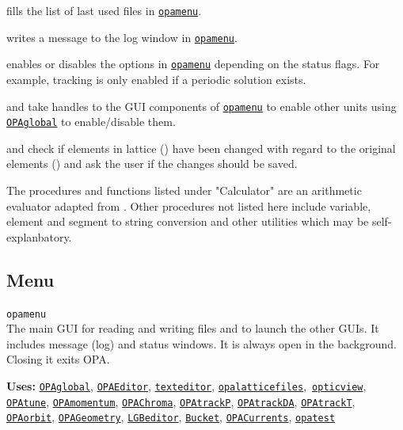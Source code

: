 \documentclass[12pt]{article}
\newcommand\code[1]{{\tt #1}}
\newcommand{\unico}[1]{{\color{burntorange}\code{#1}}}
\newcommand{\opagui}[1]{\colorbox{blue!20}{\code{#1}}}
\newcommand{\oguih}[2]{\subsection{\label{#2}#1}{\Huge\opagui{#2}}\\}
\newcommand{\ogui}[1]{\hyperref[#1]{\opagui{#1}}}
\newcommand{\opauni}[1]{\colorbox{orange!30}{\code{#1}}}
\newcommand{\ouni}[1]{\hyperref[#1]{\opauni{#1}}}
\newcommand{\uses}[1]{{\bf Uses: } #1}
\newcommand{\desc}[1]{#1}
\begin{document}
{\unico{FillComboSeg} fills the list of last used files in \ogui{opamenu}.

\unico{OPALog} writes a message to the log window in \ogui{opamenu}.

\unico{MainButtonEnable} enables or disables the options in \ogui{opamenu} depending on the status flags. For example, tracking is only enabled if a periodic solution exists.

\unico{PassMainButtonHandles} and \unico{passErrLogHandle} take handles to the GUI components of \ogui{opamenu} to enable other units using \ouni{OPAglobal} to enable/disable them.

\unico{EllaSave} and \unico{Elcompare} check if elements in lattice (\unico{Ella}) have been changed with regard to the original elements (\unico{Elem}) and ask the user if the changes should be saved.

The procedures and functions listed under "Calculator" are an arithmetic evaluator adapted from \cite{rosetta}. Other procedures not listed here include variable, element and segment to string conversion and other utilities which may be self-explanbatory.
}




\oguih{Menu}{opamenu}

\desc{The main GUI for reading and writing files and to launch the other GUIs. It includes message (log) and status windows. It is always open in the background. Closing it exits OPA.}

\uses{\ouni{OPAglobal}, \ogui{OPAEditor}, \ogui{texteditor}, \ouni{opalatticefiles},\ \ogui{opticview}, \ogui{OPAtune}, 
  \ogui{OPAmomentum}, \ogui{OPAChroma}, \ogui{OPAtrackP},  \ogui{OPAtrackDA}, \ogui{OPAtrackT}, \ogui{OPAorbit},
  \ogui{OPAGeometry}, \ogui{LGBeditor}, \ogui{Bucket}, \ogui{OPACurrents}, \ouni{opatest}}
 
\end{document}
